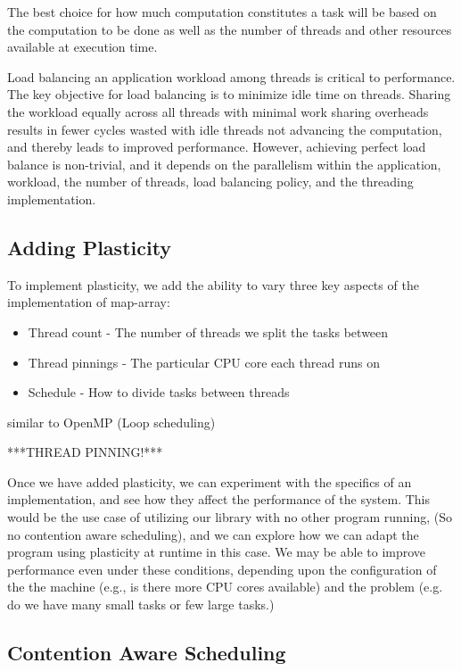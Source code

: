 The best choice for how much computation constitutes a task will be based on the computation to be done as well as the number of threads and other resources available at execution time.

Load balancing an application workload among threads is critical to performance. The key objective for load balancing is to minimize idle time on threads. Sharing the workload equally across all threads with minimal work sharing overheads results in fewer cycles wasted with idle threads not advancing the computation, and thereby leads to improved performance. However, achieving perfect load balance is non-trivial, and it depends on the parallelism within the application, workload, the number of threads, load balancing policy, and the threading implementation.





\subsection{Adding Plasticity}

To implement plasticity, we add the ability to vary three key aspects of the implementation of map-array:

\begin{itemize}
	\item Thread count - The number of threads we split the tasks between
	\item Thread pinnings - The particular CPU core each thread runs on
	\item Schedule - How to divide tasks between threads
\end{itemize}

similar to OpenMP (Loop scheduling)

***THREAD PINNING!***

Once we have added plasticity, we can experiment with the specifics of an implementation, and see how they affect the performance of the system. This would be the use case of utilizing our library with no other program running, (So no contention aware scheduling), and we can explore how we can adapt the program using plasticity at runtime in this case. We may be able to improve performance even under these conditions, depending upon the configuration of the the machine (e.g., is there more CPU cores available) and the problem (e.g. do we have many small tasks or few large tasks.) 



\subsection{Contention Aware Scheduling}

